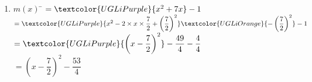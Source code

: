 \documentclass[a4paper,11pt,exos]{nsi} %
\begin{document}
\begin{multicols}{2}
\begin{enumerate}[label=\textbullet]
        \item \begin{tabbing}
            $m(x)$  \=  $=\textcolor{UGLiPurple}{x^2+7x}-1$\\
            \>  $=\textcolor{UGLiPurple}{x^2-2\times x\times \dfrac{7}{2}+\left(\dfrac{7}{2}\right)^2}\textcolor{UGLiOrange}{-\left(\dfrac{7}{2}\right)^2}-1$\\[.5em]
            \>  $=\textcolor{UGLiPurple}{\left(x-\dfrac{7}{2}\right)^2}-\dfrac{49}{4}-\dfrac{4}{4}$\\[.5em]
            \>  $=\left(x-\dfrac{7}{2}\right)^2-\dfrac{53}{4}$
        \end{tabbing}
    \end{enumerate}
\end{multicols}
\end{document}
